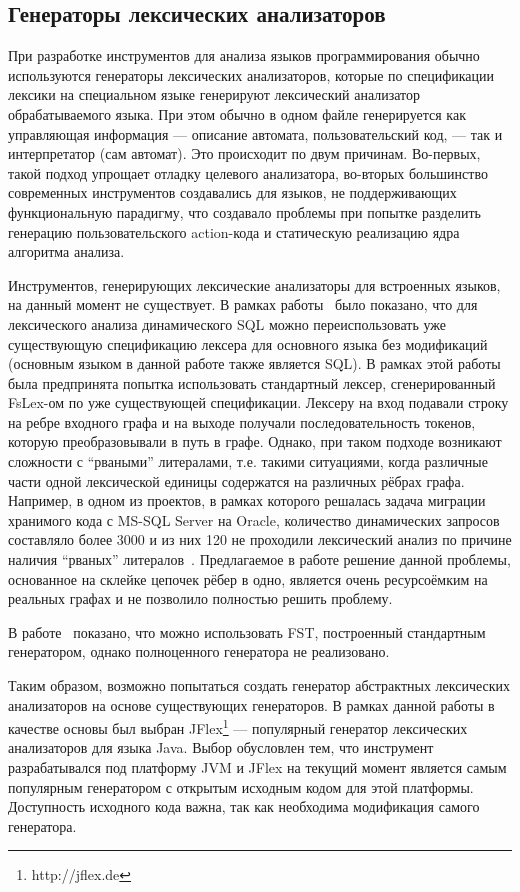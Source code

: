 \subsection{Генераторы лексических анализаторов}
При разработке инструментов для анализа языков программирования обычно 
используются генераторы лексических анализаторов, которые по спецификации лексики 
на специальном языке генерируют лексический анализатор обрабатываемого языка. 
При этом обычно в одном файле генерируется как управляющая информация --- описание 
автомата, пользовательский код, --- так и интерпретатор (сам автомат).  Это 
происходит по двум причинам. Во-первых, такой подход упрощает отладку целевого 
анализатора, во-вторых большинство современных инструментов создавались для языков, 
не поддерживающих функциональную парадигму, что создавало проблемы при попытке 
разделить генерацию пользовательского action-кода и статическую реализацию ядра 
алгоритма анализа.

Инструментов, генерирующих лексические анализаторы для встроенных языков, на 
данный момент не существует. В рамках работы~\cite{Grigoriev} было показано, что для 
лексического анализа динамического SQL можно переиспользовать уже существующую 
спецификацию лексера для основного языка без модификаций (основным языком в данной работе
также является SQL). В рамках этой работы была предпринята попытка использовать стандартный 
лексер, сгенерированный FsLex-ом по уже существующей спецификации. Лексеру на 
вход подавали строку на ребре входного графа и на выходе получали последовательность 
токенов, которую преобразовывали в путь в графе. Однако, при таком подходе 
возникают сложности с “рваными” литералами, т.е. такими ситуациями, когда 
различные части одной лексической единицы содержатся на различных рёбрах графа. 
Например, в одном из проектов, в рамках которого решалась задача миграции 
хранимого кода с MS-SQL Server на Oracle, количество динамических запросов 
составляло более 3000 и из них 120 не проходили лексический анализ по причине 
наличия “рваных” литералов~\cite{Grigoriev}. Предлагаемое в работе 
решение  данной проблемы, основанное на склейке цепочек рёбер в одно, является 
очень ресурсоёмким на реальных графах и не позволило полностью решить проблему.

В работе~\cite{ToDetect} показано, что можно использовать FST, построенный стандартным 
генератором, однако полноценного генератора не реализовано.

Таким образом, возможно попытаться создать генератор абстрактных лексических 
анализаторов на основе существующих генераторов. В рамках данной работы в 
качестве основы был выбран JFlex\footnote{http://jflex.de} --- популярный генератор лексических анализаторов 
для языка Java. Выбор обусловлен тем, что инструмент разрабатывался под платформу 
JVM и JFlex на текущий момент является самым популярным генератором с открытым 
исходным кодом для этой платформы. Доступность исходного кода важна, так как 
необходима модификация самого генератора.

